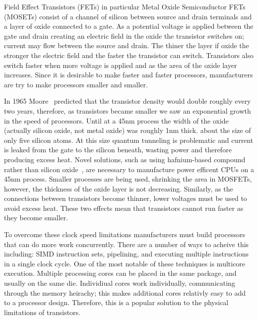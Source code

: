 %
%


Field Effect Transistors (FETs) in particular Metal Oxide Semiconductor FETs
(MOSETs) consist of a channel of silicon between source and drain terminals and
a layer of oxide connected to a gate.
As a potential voltage is applied between the gate and drain creating an
electric field in the oxide
the transistor switches on;
current may flow between the source and drain.
The thiner the layer if oxide the stronger the electric field and the faster
the transistor can switch.
Transistors also switch faster when more voltage is applied
and as the area of the oxide layer increases.
Since it is desirable to make faster and faster processors,
manufacturers are try to make processors smaller and smaller.

In 1965 Moore~\cite{moore} predicted that the transistor 
density would double roughly every two years,
therefore, as transistors became smaller we saw an
exponential growth in the speed of processors.
Until at a 45nm process the width of the oxide
(actually silicon oxide, not metal oxide)
was roughly 1nm thick.
about the size of only five silicon atoms.
At this size quantum tunneling is problematic and current is leaked from the
gate to the silicon beneath,
wasting power and therefore producing excess heat.
Novel solutions,
such as using hafnium-based compound rather than silicon
oxide~\cite{intel-high-k},
are necessary to manufacture power efficent CPUs on a 45nm process.
Smaller processes are being used, shrinking the area in MOSFETs,
however, the thickness of the oxide layer is not decreasing.
Similarly, as the connections between transistors become thinner,
lower voltages must be used to avoid excess heat.
These two effects mean that transistors cannot run faster as they become
smaller.

To overcome these clock speed limitations manufacturers must build processors
that can do more work concurrently.
There are a number of ways to acheive this including:
SIMD instruction sets,
pipelining,
and executing multiple instructions in a single clock cycle.
One of the most notable of these techniques is multicore execution.
Multiple processing cores can be placed in the same package,
and usually on the same die.
Individiual cores work individually, communicating through the memory
heirachy;
this makes additional cores relativly easy to add to a processor design.
Therefore, this is a popular solution to the physical limitations of
transistors.

